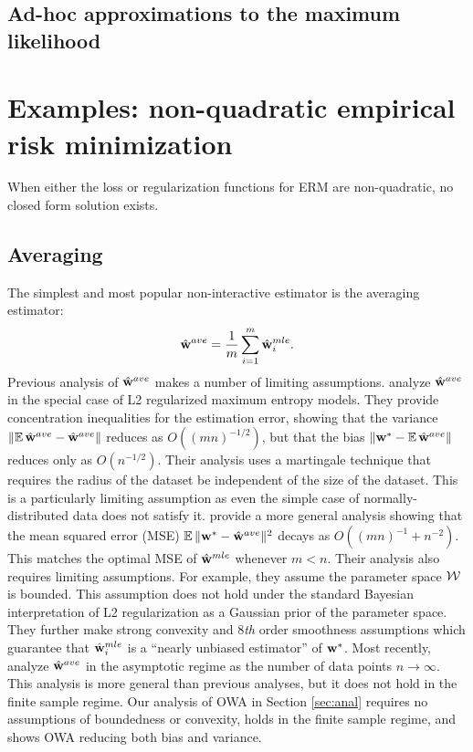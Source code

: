 \documentclass[thesis.tex]{subfiles}
\begin{document}

\subsection{Ad-hoc approximations to the maximum likelihood}




\section{Examples: non-quadratic empirical risk minimization}

When either the loss or regularization functions for ERM are non-quadratic,
no closed form solution exists.


\subsection{Averaging}
\label{sec:merge:ave}

The simplest and most popular non-interactive estimator is the averaging estimator:
\begin{equation}
\hat{\mathbf w}^{ave} = \frac{1}{m}\sum_{i=1}^m \hat{\mathbf w}^{mle}_i
.
\end{equation}
Previous analysis of $\hat{\mathbf w}^{ave}$ makes a number of limiting assumptions.
\citet{mcdonald2009efficient} analyze $\hat{\mathbf w}^{ave}$ in the special case of L2 regularized maximum entropy models.
They provide concentration inequalities for the estimation error,
showing that the variance ${\lVert {\operatorname*{\mathbb E}\hat{\mathbf w}^{ave}-\hat{\mathbf w}^{ave}} \rVert}$ reduces as $O((mn)^{-1/2})$,
but that the bias ${\lVert {{\mathbf w^{*}}-\operatorname*{\mathbb E}\hat{\mathbf w}^{ave}} \rVert}$ reduces only as $O(n^{-1/2})$.
Their analysis uses a martingale technique that requires the radius of the dataset be independent of the size of the dataset.
This is a particularly limiting assumption as even the simple case of
normally-distributed data does not satisfy it.
\citet{zhang2012communication} provide a more general analysis showing that the mean squared error (MSE) $\operatorname*{\mathbb E}{\lVert {{\mathbf w^{*}}-\hat{\mathbf w}^{ave}} \rVert}{}^2$ decays as $O((mn)^{-1} + n^{-2})$.
This matches the optimal MSE of $\hat{\mathbf w}^{mle}$ whenever $m<n$.
Their analysis also requires limiting assumptions.
For example, they assume the parameter space ${\mathcal W}$ is bounded.
This assumption does not hold under the standard Bayesian interpretation of L2 regularization as a Gaussian prior of the parameter space.
They further make strong convexity and 8\emph{th} order smoothness assumptions which guarantee that $\hat{\mathbf w}^{mle}_i$ is a ``nearly unbiased estimator'' of ${\mathbf w^{*}}$.
Most recently, \citet{rosenblatt2016optimality} analyze $\hat{\mathbf w}^{ave}$ in the asymptotic regime as the number of data points $n\to\infty$.
This analysis is more general than previous analyses, but it does not hold in the finite sample regime.
Our analysis of OWA in Section \ref{sec:anal} requires no assumptions of boundedness or convexity, holds in the finite sample regime, and shows OWA reducing both bias and variance.
\end{document}
